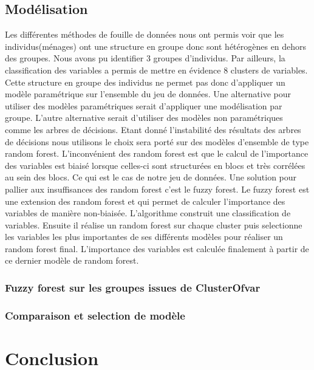 \documentclass[11pt,a4paper, x11names]{article}\usepackage[]{graphicx}\usepackage[]{color}
\begin{document}
\subsection{Modélisation}
Les différentes méthodes de fouille de données nous ont permis voir que les individus(ménages) ont une structure en groupe donc sont hétérogènes en dehors des groupes. 
Nous avons pu identifier 3 groupes d'individus. Par ailleurs, la classification des variables a permis de mettre en évidence 8 clusters de variables. Cette structure en groupe des individus ne permet pas donc d'appliquer un modèle paramétrique sur l'ensemble du jeu de données. Une alternative pour utiliser des modèles paramétriques serait d'appliquer une modélisation par groupe. L'autre alternative serait d'utiliser des modèles non paramétriques comme les arbres de décisions. Etant donné l'instabilité des résultats des arbres de décisions nous utilisons le choix sera porté sur des modèles d'ensemble de type random forest. L'inconvénient des random forest est que le calcul de l'importance des variables est biaisé lorsque celles-ci sont structurées en blocs et très corrélées au sein des blocs. Ce qui est le cas de notre jeu de données. Une solution pour pallier aux insuffisances des random forest c'est le fuzzy forest. Le fuzzy forest est une extension des random forest et qui permet de calculer l'importance des variables de manière non-biaisée.  
L'algorithme construit une classification de variables. Ensuite il réalise un random forest sur chaque cluster puis selectionne les variables les plus importantes de ses différents modèles pour réaliser un random forest final. L'importance des variables est calculée finalement à partir de ce dernier modèle de random forest.
\subsubsection{Fuzzy forest sur les groupes issues de ClusterOfvar}


\subsubsection{Comparaison et selection de modèle}

\section{Conclusion}
\end{document}
